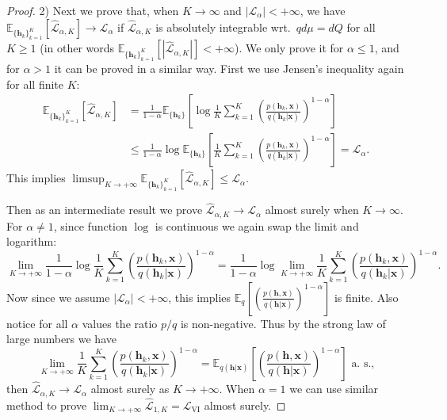 \begin{proof}
2) Next we prove that, when $K \rightarrow \infty$ and $|\mathcal{L}_{\alpha}| < +\infty$, we have $\mathbb{E}_{\{ \bm{h}_k \}_{k=1}^K }[\hat{\mathcal{L}}_{\alpha, K}] \rightarrow \mathcal{L}_{\alpha}$ if $\hat{\mathcal{L}}_{\alpha, K}$ is absolutely integrable wrt.~$qd\mu = dQ$ for all $K \geq 1$ (in other words $\mathbb{E}_{\{ \bm{h}_k \}_{k=1}^K }[|\hat{\mathcal{L}}_{\alpha, K}|] < +\infty$). We only prove it for $\alpha \leq 1$, and for $\alpha > 1$ it can be proved in a similar way. First we use Jensen's inequality again for all finite $K$:
\begin{equation*}
 \begin{aligned}
  \mathbb{E}_{\{ \bm{h}_k \}_{k=1}^K }[\hat{\mathcal{L}}_{\alpha, K}] 
  &= \frac{1}{1 - \alpha} \mathbb{E}_{\{ \bm{h}_k \}} \left[ \log \frac{1}{K} \sum_{k=1}^K \left( \frac{p(\bm{h}_k, \bm{x})}{q(\bm{h}_k|\bm{x})}  \right)^{1 - \alpha} \right] \\
  &\leq \frac{1}{1 - \alpha} \log \mathbb{E}_{\{ \bm{h}_k \}} \left[ \frac{1}{K} \sum_{k=1}^K \left( \frac{p(\bm{h}_k, \bm{x})}{q(\bm{h}_k|\bm{x})}  \right)^{1 - \alpha} \right] = \mathcal{L}_{\alpha}.
 \end{aligned}
\end{equation*}
This implies $\limsup_{K \rightarrow +\infty} \mathbb{E}_{\{ \bm{h}_k \}_{k=1}^K }[\hat{\mathcal{L}}_{\alpha, K}] \leq \mathcal{L}_{\alpha}$. 

Then as an intermediate result we prove $\hat{\mathcal{L}}_{\alpha, K} \rightarrow \mathcal{L}_{\alpha}$ almost surely when $K \rightarrow \infty$. For $\alpha \neq 1$, since function $\log $ is continuous we again swap the limit and logarithm:
\begin{equation*}
\lim_{K \rightarrow +\infty} \frac{1}{1 - \alpha} \log \frac{1}{K} \sum_{k=1}^K \left( \frac{p(\bm{h}_k, \bm{x})}{q(\bm{h}_k|\bm{x})}  \right)^{1 - \alpha}  
=  \frac{1}{1 - \alpha} \log \lim_{K \rightarrow +\infty} \frac{1}{K} \sum_{k=1}^K \left( \frac{p(\bm{h}_k, \bm{x})}{q(\bm{h}_k|\bm{x})}  \right)^{1 - \alpha} .
\end{equation*}
Now since we assume $|\mathcal{L}_{\alpha}| < +\infty$, this implies $\mathbb{E}_{q} \left[ \left( \frac{p(\bm{h}, \bm{x})}{q(\bm{h}|\bm{x})} \right)^{1 - \alpha} \right]$ is finite. Also notice for all $\alpha$ values the ratio $p/q$ is non-negative. Thus by the strong law of large numbers we have
\begin{equation*}
\lim_{K \rightarrow +\infty} \frac{1}{K} \sum_{k=1}^K \left( \frac{p(\bm{h}_k, \bm{x})}{q(\bm{h}_k|\bm{x})}  \right)^{1 - \alpha} = \mathbb{E}_{q(\bm{h}|\bm{x})} \left[ \left( \frac{p(\bm{h}, \bm{x})}{q(\bm{h}|\bm{x})} \right)^{1 - \alpha} \right] \text{ a.~s.,}
\end{equation*}
%
then $\hat{\mathcal{L}}_{\alpha, K} \rightarrow \mathcal{L}_{\alpha}$ almost surely as $K \rightarrow +\infty$. When $\alpha = 1$ we can use similar method to prove $\lim_{K \rightarrow +\infty} \hat{\mathcal{L}}_{1, K} = \mathcal{L}_{\text{VI}}$ almost surely.


\end{proof}
